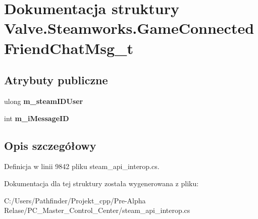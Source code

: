 \hypertarget{struct_valve_1_1_steamworks_1_1_game_connected_friend_chat_msg__t}{}\section{Dokumentacja struktury Valve.\+Steamworks.\+Game\+Connected\+Friend\+Chat\+Msg\+\_\+t}
\label{struct_valve_1_1_steamworks_1_1_game_connected_friend_chat_msg__t}
\subsection*{Atrybuty publiczne}
\begin{DoxyCompactItemize}
\item 
\mbox{\label{struct_valve_1_1_steamworks_1_1_game_connected_friend_chat_msg__t_a236e9e20ccb22e616ec65ff9ffbac546}} 
ulong {\bfseries m\+\_\+steam\+I\+D\+User}
\item 
\mbox{\label{struct_valve_1_1_steamworks_1_1_game_connected_friend_chat_msg__t_a0296e62311b9311625fef0fb3d9cf0a2}} 
int {\bfseries m\+\_\+i\+Message\+ID}
\end{DoxyCompactItemize}


\subsection{Opis szczegółowy}


Definicja w linii 9842 pliku steam\+\_\+api\+\_\+interop.\+cs.



Dokumentacja dla tej struktury została wygenerowana z pliku\+:\begin{DoxyCompactItemize}
\item 
C\+:/\+Users/\+Pathfinder/\+Projekt\+\_\+cpp/\+Pre-\/\+Alpha Relase/\+P\+C\+\_\+\+Master\+\_\+\+Control\+\_\+\+Center/steam\+\_\+api\+\_\+interop.\+cs\end{DoxyCompactItemize}
